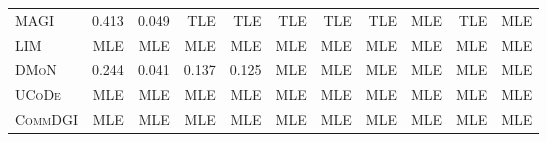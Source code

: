 \documentclass[11pt,a4paper]{article}
\begin{document}
\begin{table}[H]
\begin{tabular*}{\textwidth}{@{\extracolsep{\fill}}l rrrrrrrrrr@{}}
        \textsc{MAGI} & 0.413 & 0.049 & TLE & TLE & TLE & TLE & TLE & MLE & TLE & MLE \\
        \textsc{LIM} & MLE & MLE & MLE & MLE & MLE & MLE & MLE & MLE & MLE & MLE \\
        \textsc{DMoN} & 0.244 & 0.041 & 0.137 & 0.125 & MLE & MLE & MLE & MLE & MLE & MLE \\
        \textsc{UCoDe} & MLE & MLE & MLE & MLE & MLE & MLE & MLE & MLE & MLE & MLE \\
        \textsc{CommDGI} & MLE & MLE & MLE & MLE & MLE & MLE & MLE & MLE & MLE & MLE \\
        \bottomrule
    \end{tabular*}
\end{table}
\end{document}

